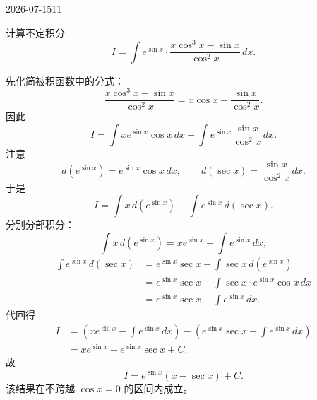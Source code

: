 \begin{mistake}{2026-07-15}{11}

\begin{problemcontent}
计算不定积分
\[
I=\int e^{\sin x}\cdot \frac{x\cos^3 x-\sin x}{\cos^2 x}\,dx .
\]
\end{problemcontent}

\begin{solutioncontent}
先化简被积函数中的分式：
\[
\frac{x\cos^3 x-\sin x}{\cos^2 x}=x\cos x-\frac{\sin x}{\cos^2 x}.
\]
因此
\[
I=\int x e^{\sin x}\cos x\,dx-\int e^{\sin x}\frac{\sin x}{\cos^2 x}\,dx.
\]
注意
\[
d(e^{\sin x})=e^{\sin x}\cos x\,dx,\qquad d(\sec x)=\frac{\sin x}{\cos^2 x}\,dx.
\]
于是
\[
I=\int x\,d(e^{\sin x})-\int e^{\sin x}\,d(\sec x).
\]
分别分部积分：
\[
\int x\,d(e^{\sin x})=xe^{\sin x}-\int e^{\sin x}\,dx,
\]
\[
\begin{aligned}
\int e^{\sin x}\,d(\sec x)
&=e^{\sin x}\sec x-\int \sec x\,d(e^{\sin x})\\
&=e^{\sin x}\sec x-\int \sec x\cdot e^{\sin x}\cos x\,dx\\
&=e^{\sin x}\sec x-\int e^{\sin x}\,dx.
\end{aligned}
\]
代回得
\[
\begin{aligned}
I
&=\left(xe^{\sin x}-\int e^{\sin x}\,dx\right)
-\left(e^{\sin x}\sec x-\int e^{\sin x}\,dx\right)\\
&=xe^{\sin x}-e^{\sin x}\sec x+C.
\end{aligned}
\]
故
\[
I=e^{\sin x}(x-\sec x)+C.
\]
该结果在不跨越 \(\cos x=0\) 的区间内成立。
\end{solutioncontent}


\end{mistake}
